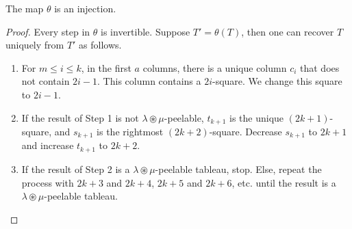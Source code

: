 \documentclass[ALCO,Unicode]{cedram}
\begin{document}
    \begin{lemma}\label{lem:injection}
        The map $\theta$ is an injection.
    \end{lemma}

    \begin{proof}
        Every step in $\theta$ is invertible. Suppose $T' = \theta(T)$, then one can recover $T$ uniquely from $T'$ as follows.

        \begin{enumerate}
            \item For $m\leq i \leq k$, in the first $a$ columns, there is a unique column $c_i$ that does not contain $2i-1$. This column contains a $2i$-square. We change this square to $2i-1$.
            \item If the result of Step 1 is not $\lambda\circledast\mu$-peelable, $t_{k+1}$ is the unique $(2k+1)$-square, and $s_{k+1}$ is the rightmost $(2k+2)$-square. Decrease $s_{k+1}$ to $2k+1$ and increase $t_{k+1}$ to $2k+2$.
            \item If the result of Step 2 is a $\lambda\circledast\mu$-peelable tableau, stop. Else, repeat the process with $2k+3$ and $2k+4$, $2k+5$ and $2k+6$, etc. until the result is a $\lambda\circledast\mu$-peelable tableau. \qedhere
        \end{enumerate}
    \end{proof}




\end{document}
